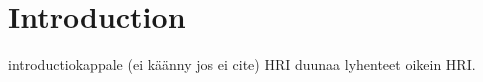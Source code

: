 \section{Introduction}

introductiokappale \cite{SGP} (ei käänny jos ei cite) \ac{HRI} duunaa lyhenteet oikein \ac{HRI}.
